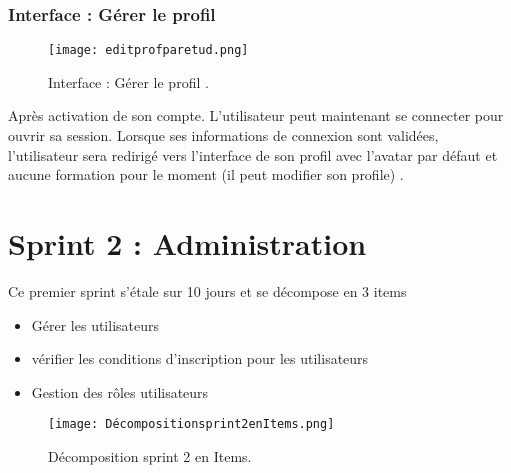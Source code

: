 \subsubsection{ Interface : Gérer le profil  }


\begin{figure}[ht]
	\centering
	\texttt{[image: editprofparetud.png]}
	\caption{Interface : Gérer le profil .}
	\label{fig:Interface : Gérer le profi }
\end{figure}
\FloatBarrier
Après activation de son compte. L’utilisateur peut maintenant se connecter pour ouvrir sa session.
Lorsque ses informations de connexion sont validées, l’utilisateur sera redirigé vers
l’interface de son profil avec l’avatar par défaut et aucune formation pour le moment (il peut modifier son profile) .


\clearpage



\section{Sprint 2 : Administration }



\begin{fquote}
Ce premier sprint s’étale sur 10 jours et se décompose en 3 items \end{fquote}
\smallskip
\begin{itemize}[label=$\diamond$]
	\item Gérer les utilisateurs
    \item  vérifier les conditions d'inscription pour les utilisateurs
    \item  Gestion des rôles utilisateurs
	
\end{itemize}
\medskip
\medskip
\medskip
\medskip
\medskip
\medskip
\medskip
\medskip
\medskip
\medskip
\medskip
\begin{figure}[ht]
	\centering
	\texttt{[image: Décompositionsprint2enItems.png]}
	\caption{Décomposition sprint 2 en Items.}
	\label{fig:Décomposition sprint 2 en Items}
\end{figure}
\FloatBarrier
\clearpage


   
 




